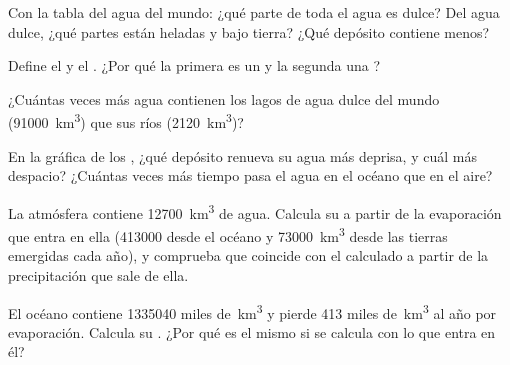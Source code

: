 \begin{exercise}[$\star$]\label{exo:g10:freshwater-resources:2}
Con la tabla del agua del mundo: ¿qué parte de toda el agua es dulce? Del
agua dulce, ¿qué partes están heladas y bajo tierra? ¿Qué depósito contiene
menos?
\end{exercise}

\begin{exercise}[$\star$]\label{exo:g10:freshwater-resources:3}
Define el  y el . ¿Por qué la
primera es un  y la segunda una ?
\end{exercise}

\begin{exercise}[$\star$]\label{exo:g10:freshwater-resources:4}
¿Cuántas veces más agua contienen los lagos de agua dulce del mundo
(\num{91000}~\unit{km^3}) que sus ríos (\num{2120}~\unit{km^3})?
\end{exercise}

\begin{exercise}[$\star$]\label{exo:g10:freshwater-resources:5}
En la gráfica de los , ¿qué depósito renueva su agua más
deprisa, y cuál más despacio? ¿Cuántas veces más tiempo pasa el agua en el
océano que en el aire?
\end{exercise}

\begin{exercise}[$\star\star$]\label{exo:g10:freshwater-resources:6}
La atmósfera contiene \num{12700}~\unit{km^3} de agua. Calcula su  a partir de la evaporación que entra en ella (\num{413000} desde el
océano y \num{73000}~\unit{km^3} desde las tierras emergidas cada año), y
comprueba que coincide con el  calculado a partir de la
precipitación que sale de ella.
\end{exercise}

\begin{exercise}[$\star\star$]\label{exo:g10:freshwater-resources:7}
El océano contiene \num{1335040} miles de~\unit{km^3} y pierde \num{413}
miles de~\unit{km^3} al año por evaporación. Calcula su .
¿Por qué es el mismo si se calcula con lo que entra en él?
\end{exercise}

